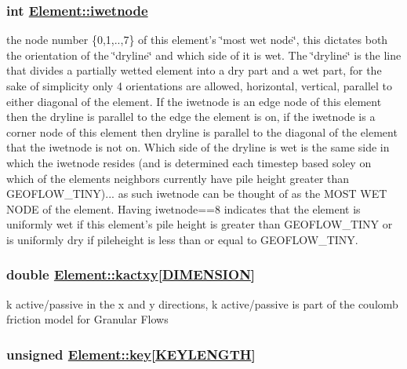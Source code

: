 \hypertarget{classElement_r50}{
\subsubsection[iwetnode]{\setlength{\rightskip}{0pt plus 5cm}int \hyperlink{classElement_r50}{Element::iwetnode}}}
\label{classElement_r50}


the node number \{0,1,..,7\} of this element's \char`\"{}most wet node\char`\"{}, this dictates both the orientation of the \char`\"{}dryline\char`\"{} and which side of it is wet. The \char`\"{}dryline\char`\"{} is the line that divides a partially wetted element into a dry part and a wet part, for the sake of simplicity only 4 orientations are allowed, horizontal, vertical, parallel to either diagonal of the element. If the iwetnode is an edge node of this element then the dryline is parallel to the edge the element is on, if the iwetnode is a corner node of this element then dryline is parallel to the diagonal of the element that the iwetnode is not on. Which side of the dryline is wet is the same side in which the iwetnode resides (and is determined each timestep based soley on which of the elements neighbors currently have pile height greater than GEOFLOW\_\-TINY)... as such iwetnode can be thought of as the MOST WET NODE of the element. Having iwetnode==8 indicates that the element is uniformly wet if this element's pile height is greater than GEOFLOW\_\-TINY or is uniformly dry if pileheight is less than or equal to GEOFLOW\_\-TINY. 

\hypertarget{classElement_r36}{
\subsubsection[kactxy]{\setlength{\rightskip}{0pt plus 5cm}double \hyperlink{classElement_r36}{Element::kactxy}\mbox{[}\hyperlink{constant_8h_a15}{DIMENSION}\mbox{]}}}
\label{classElement_r36}


k active/passive in the x and y directions, k active/passive is part of the coulomb friction model for Granular Flows 

\hypertarget{classElement_r6}{
\subsubsection[key]{\setlength{\rightskip}{0pt plus 5cm}unsigned \hyperlink{classElement_r6}{Element::key}\mbox{[}\hyperlink{constant_8h_a10}{KEYLENGTH}\mbox{]}}}
\label{classElement_r6}


